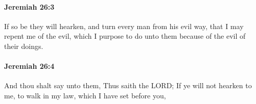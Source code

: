 		\paragraph{Jeremiah 26:3} %
			\label{JEREMIAH-26-3}

			If so be they will hearken, and turn every man from his evil way, that I may repent me of the evil, which I purpose to do unto them because of the evil of their doings.


		\paragraph{Jeremiah 26:4} %
			\label{JEREMIAH-26-4}

			And thou shalt say unto them, Thus saith the LORD; If ye will not hearken to me, to walk in my law, which I have set before you,


